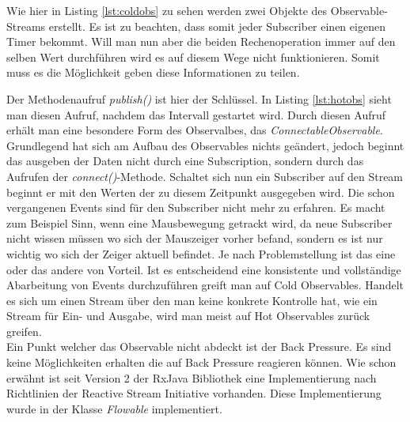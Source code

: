 
Wie hier in Listing \ref{lst:coldobs} zu sehen werden zwei Objekte des Observable-Streams erstellt. Es ist zu beachten, dass somit jeder Subscriber einen eigenen Timer bekommt. Will man nun aber die beiden Rechenoperation immer auf den selben Wert durchführen wird es auf diesem Wege nicht funktionieren. Somit muss es die Möglichkeit geben diese Informationen zu teilen.

Der Methodenaufruf \textit{publish()} ist hier der Schlüssel. In Listing \ref{lst:hotobs} sieht man diesen Aufruf, nachdem das Intervall gestartet wird. Durch diesen Aufruf erhält man eine besondere Form des Observalbes, das \textit{ConnectableObservable}. Grundlegend hat sich am Aufbau des Observables nichts geändert, jedoch beginnt das ausgeben der Daten nicht durch eine Subscription, sondern durch das Aufrufen der \textit{connect()}-Methode. Schaltet sich nun ein Subscriber auf den Stream beginnt er mit den Werten der zu diesem Zeitpunkt ausgegeben wird. Die schon vergangenen Events sind für den Subscriber nicht mehr  zu erfahren. Es macht zum Beispiel Sinn, wenn eine Mausbewegung getrackt wird, da neue Subscriber nicht wissen müssen wo sich der Mauszeiger vorher befand, sondern es ist nur wichtig wo sich der Zeiger aktuell befindet. Je nach Problemstellung ist das eine oder das andere von Vorteil. Ist es entscheidend eine konsistente und vollständige Abarbeitung von Events durchzuführen greift man auf Cold Observables. Handelt es sich um einen Stream über den man keine konkrete Kontrolle hat, wie ein Stream für Ein- und Ausgabe, wird man meist auf Hot Observables zurück greifen. \\ Ein Punkt welcher das Observable nicht abdeckt ist der Back Pressure. Es sind keine Möglichkeiten erhalten die auf Back Pressure reagieren können. Wie schon erwähnt ist seit Version 2 der RxJava Bibliothek eine Implementierung nach Richtlinien der Reactive Stream Initiative vorhanden. Diese Implementierung wurde in der Klasse \textit{Flowable} implementiert.
